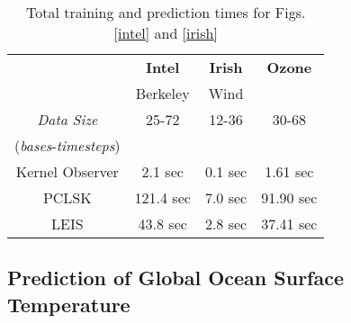 \begin{table}[h]
	\centering
	\caption{Total training and prediction times for Figs. \ref{intel} and \ref{irish} } \label{tab:timing}
		\begin{tabular}{c|ccc}
		\toprule
			{\bf }  & {\bf Intel } & {\bf Irish } &  {\bf Ozone}  \\
			& Berkeley & Wind & \\
			\midrule
			\emph{Data Size}        & 25-72 & 12-36  & {30-68} \\ 
		    (\emph{bases}-\emph{timesteps})                 &       & & \\ \hline
			Kernel Observer         & 2.1 sec & 0.1 sec & 1.61 sec \\
			PCLSK             & 121.4 sec & 7.0 sec & 91.90 sec \\
			LEIS             & 43.8 sec & 2.8 sec & 37.41 sec\\
		\bottomrule
		\end{tabular}
\end{table}


\subsection{Prediction of Global Ocean Surface Temperature}\label{sec:avhhr}

